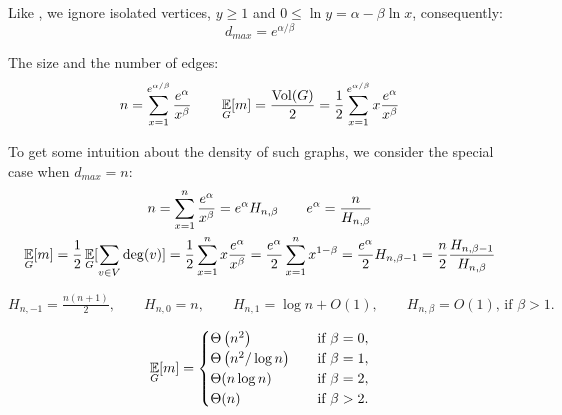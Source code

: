 Like \cite{acl01}, we ignore isolated vertices, $y\geq1$
and $0\leq\ln y=\alpha-\beta\ln x$, consequently:
\begin{equation}
    d_{max}=e^{\alpha/\beta}
\end{equation}

The size and the number of edges:
\begin{equation}
    \label{eq:powerlaw-coin-toss-n-e}
    n=\sum_{x=1}^{e^{\alpha/\beta}}{\frac{e^\alpha}{x^\beta}}
    \qquad \mathop{{}\mathbb{E}}_G[m]=\frac{\operatorname*{Vol}(G)}{2}=\frac{1}{2}\sum_{x=1}^{e^{\alpha/\beta}}{x\frac{e^\alpha}{x^\beta}}
\end{equation}

%
%
%
%

To get some intuition about the density of such graphs,
we consider the special case when $d_{max}=n$:
\begin{gather}
    n=\sum_{x=1}^{n}\frac{e^\alpha}{x^\beta}=e^\alpha H_{n,\beta} \qquad e^\alpha=\frac{n}{H_{n,\beta}}\\
    \mathop{{}\mathbb{E}}_G[m]=\frac{1}{2}\mathop{{}\mathbb{E}}_G[\sum_{v \in V}\deg(v)]=\frac{1}{2}\sum_{x=1}^{n}x\frac{e^\alpha}{x^\beta}
    =\frac{e^\alpha}{2}\sum_{x=1}^{n}x^{1-\beta}=\frac{e^\alpha}{2}H_{n,\beta-1}
    =\frac{n}{2}\frac{H_{n,\beta-1}}{H_{n,\beta}}
\end{gather}

$H_{n,-1}=\frac{n(n+1)}{2},
\qquad H_{n,0}=n,
\qquad H_{n,1}=\log n+O(1),
\qquad H_{n,\beta}=O(1)\text{, if }\beta>1.$

\begin{equation}
    \mathop{{}\mathbb{E}}_G[m]=
    \begin{cases}
        \Theta\left(n^2\right) & \quad \text{if } \beta=0,\\
        \Theta\left(n^2/\log n\right) & \quad \text{if } \beta=1,\\
        \Theta(n\log n) & \quad \text{if } \beta=2,\\
        \Theta(n) & \quad \text{if } \beta>2.
    \end{cases}
\end{equation}

